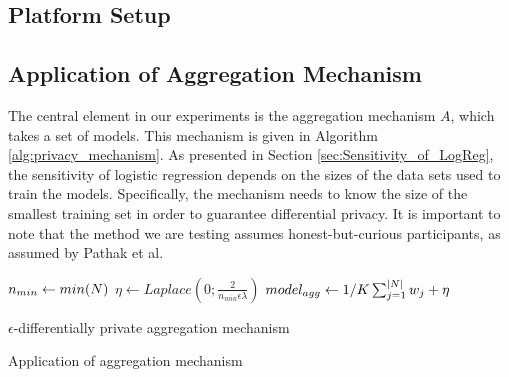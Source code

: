 \subsection{Platform Setup}

\subsection{Application of Aggregation Mechanism}

The central element in our experiments is the aggregation mechanism $A$, which takes a set of models. This mechanism is given in Algorithm \ref{alg:privacy_mechanism}. As presented in Section \ref{sec:Sensitivity_of_LogReg}, the sensitivity of logistic regression depends on the sizes of the data sets used to train the models. Specifically, the mechanism needs to know the size of the smallest training set in order to guarantee differential privacy. It is important to note that the method we are testing assumes honest-but-curious participants, as assumed by Pathak et al\cite{pathak2010diffprivhomo}.

\begin{algorithm}[H]
	\label{alg:privacy_mechanism}
		$n_{min} \leftarrow min(\boldmath{N})$\;
		$\eta \leftarrow Laplace(0; \frac{2}{n_{min}\epsilon\lambda})$\;
		$model_{agg} \leftarrow 1/K\sum_{j=1}^{|\boldmath{N}|} \boldmath{w_j} + \boldmath{\eta}$\;
		
\caption{$\epsilon$-differentially private aggregation mechanism}
\end{algorithm}


\begin{algorithm}[H]
\caption{Application of aggregation mechanism}
\end{algorithm}

